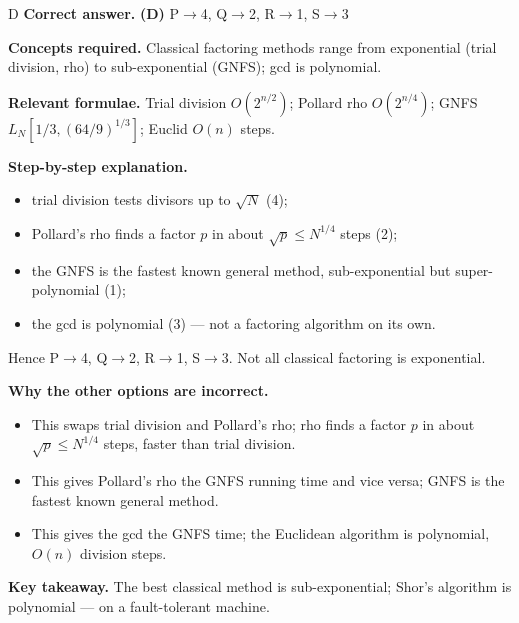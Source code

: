 \documentclass[11pt,a4paper]{article}
\newcommand{\qsep}{\par\vspace{2pt}{\color{black!15}\hrule}\vspace{4pt}}
\begin{document}
\begin{solbox}{D}
\textbf{\color{brand}Correct answer.} \textcolor{okgreen}{\textbf{(D)}} P$\to$4, Q$\to$2, R$\to$1, S$\to$3

\textbf{\color{brand}Concepts required.} Classical factoring methods range from exponential (trial division, rho) to sub-exponential (GNFS); gcd is polynomial.

\textbf{\color{brand}Relevant formulae.} Trial division $O(2^{n/2})$; Pollard rho $O(2^{n/4})$; GNFS $L_N[1/3, (64/9)^{1/3}]$; Euclid $O(n)$ steps.

\textbf{\color{brand}Step-by-step explanation.} \begin{itemize}\itemsep0pt
\item trial division tests divisors up to $\sqrt N$ (4);
\item Pollard's rho finds a factor $p$ in about $\sqrt p \le N^{1/4}$ steps (2);
\item the GNFS is the fastest known general method, sub-exponential but super-polynomial (1);
\item the gcd is polynomial (3) --- not a factoring algorithm on its own.
\end{itemize}
Hence P$\to$4, Q$\to$2, R$\to$1, S$\to$3. Not all classical factoring is exponential.

\textbf{\color{brand}Why the other options are incorrect.}
\begin{itemize}[leftmargin=2.4em, itemsep=1pt, topsep=2pt]
\item[\textbf{(A)}] This swaps trial division and Pollard's rho; rho finds a factor $p$ in about $\sqrt p \le N^{1/4}$ steps, faster than trial division.
\item[\textbf{(B)}] This gives Pollard's rho the GNFS running time and vice versa; GNFS is the fastest known general method.
\item[\textbf{(C)}] This gives the gcd the GNFS time; the Euclidean algorithm is polynomial, $O(n)$ division steps.
\end{itemize}
\textbf{\color{brand}Key takeaway.} The best classical method is sub-exponential; Shor's algorithm is polynomial --- on a fault-tolerant machine.
\end{solbox}
\qsep
\end{document}
